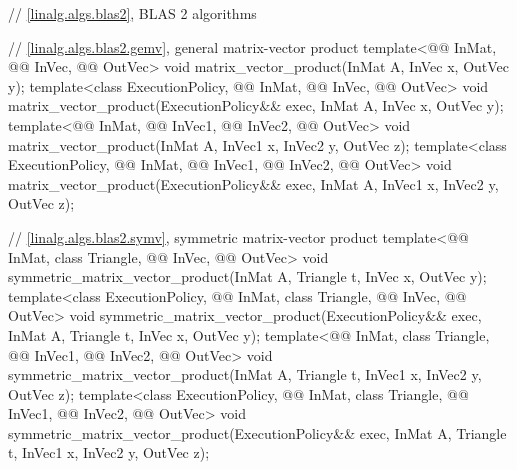 \begin{codeblock}
{  // \ref{linalg.algs.blas2}, BLAS 2 algorithms

  // \ref{linalg.algs.blas2.gemv}, general matrix-vector product
  template<@@ InMat, @@ InVec, @@ OutVec>
    void matrix_vector_product(InMat A, InVec x, OutVec y);
  template<class ExecutionPolicy, @@ InMat, @@ InVec, @@ OutVec>
    void matrix_vector_product(ExecutionPolicy&& exec,
                               InMat A, InVec x, OutVec y);
  template<@@ InMat, @@ InVec1, @@ InVec2, @@ OutVec>
    void matrix_vector_product(InMat A, InVec1 x, InVec2 y, OutVec z);
  template<class ExecutionPolicy,
           @@ InMat, @@ InVec1, @@ InVec2, @@ OutVec>
    void matrix_vector_product(ExecutionPolicy&& exec,
                               InMat A, InVec1 x, InVec2 y, OutVec z);

  // \ref{linalg.algs.blas2.symv}, symmetric matrix-vector product
  template<@@ InMat, class Triangle, @@ InVec, @@ OutVec>
    void symmetric_matrix_vector_product(InMat A, Triangle t, InVec x, OutVec y);
  template<class ExecutionPolicy,
           @@ InMat, class Triangle, @@ InVec, @@ OutVec>
    void symmetric_matrix_vector_product(ExecutionPolicy&& exec,
                                         InMat A, Triangle t, InVec x, OutVec y);
  template<@@ InMat, class Triangle, @@ InVec1, @@ InVec2,
           @@ OutVec>
    void symmetric_matrix_vector_product(InMat A, Triangle t, InVec1 x, InVec2 y, OutVec z);
  template<class ExecutionPolicy,
           @@ InMat, class Triangle, @@ InVec1, @@ InVec2,
           @@ OutVec>
    void symmetric_matrix_vector_product(ExecutionPolicy&& exec,
                                         InMat A, Triangle t, InVec1 x, InVec2 y, OutVec z);

}
\end{codeblock}
